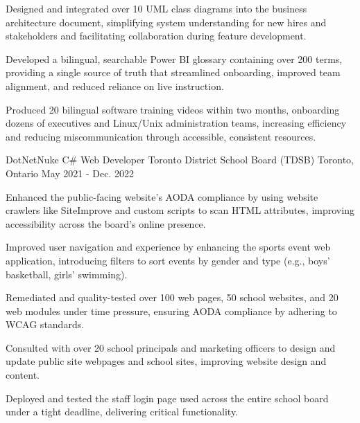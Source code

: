 \begin{cventries}
{\begin{cvitems}
      \item {Designed and integrated over 10 UML class diagrams into the business architecture document, simplifying system understanding for new hires and stakeholders and facilitating collaboration during feature development.}
      \item {Developed a bilingual, searchable Power BI glossary containing over 200 terms, providing a single source of truth that streamlined onboarding, improved team alignment, and reduced reliance on live instruction.}
      \item {Produced 20 bilingual software training videos within two months, onboarding dozens of executives and Linux/Unix administration teams, increasing efficiency and reducing miscommunication through accessible, consistent resources.}
    \end{cvitems}
  }

\cventry
  {DotNetNuke C\# Web Developer} %
  {Toronto District School Board (TDSB)} %
  {Toronto, Ontario} %
  {May 2021 - Dec. 2022} %
  { %
    \begin{cvitems}
      \item {Enhanced the public-facing website's AODA compliance by using website crawlers like SiteImprove and custom scripts to scan HTML attributes, improving accessibility across the board's online presence.}
      \item {Improved user navigation and experience by enhancing the sports event web application, introducing filters to sort events by gender and type (e.g., boys' basketball, girls' swimming).}
      \item {Remediated and quality-tested over 100 web pages, 50 school websites, and 20 web modules under time pressure, ensuring AODA compliance by adhering to WCAG standards.}
      \item {Consulted with over 20 school principals and marketing officers to design and update public site webpages and school sites, improving website design and content.}
      \item {Deployed and tested the staff login page used across the entire school board under a tight deadline, delivering critical functionality.}
    \end{cvitems}
  }


\end{cventries}
